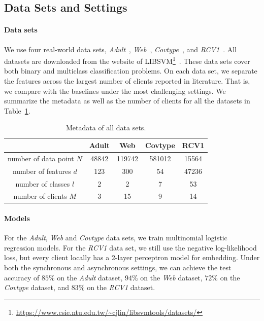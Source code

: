 \subsection{Data Sets and Settings} \label{sec:8.8.1}

\paragraph{Data sets} We use four real-world data sets, \emph{Adult}~\cite{zeng2008fast}, \emph{Web}~\cite{platt1998fast}, \emph{Covtype}~\cite{blackard1999comparative}, and \emph{RCV1}~\cite{lewis2004rcv1}. All datasets are downloaded from the website of LIBSVM\footnote{\url{https://www.csie.ntu.edu.tw/~cjlin/libsvmtools/datasets/}}~\cite{libsvm}. These data sets cover both binary and multiclass classification problems. On each data set, we separate the features across the largest number of clients reported in literature. That is, we compare with the baselines under the most challenging settings. We summarize the metadata as well as the number of clients for all the datasets in Table~\ref{tab:metadata}.

\begin{table}[t]
    \centering
    \begin{tabular}{ccccc}
    \toprule
                                & Adult     & Web       & Covtype   & RCV1 \\ \midrule
     number of data point $N$   & 48842     & 119742    & 581012    & 15564   \\
     number of features $d$     & 123       & 300       & 54        & 47236\\
     number of classes $l$      & 2         & 2         & 7         & 53   \\
     number of clients $M$      & 3         & 15        & 9         &14   \\
    \bottomrule
    \end{tabular}
    \caption{Metadata of all data sets.}
    \label{tab:metadata}
\end{table}

\paragraph{Models} For the \emph{Adult}, \emph{Web} and \emph{Covtype} data sets, we train multinomial logistic regression models. For the \emph{RCV1} data set, we still use the negative log-likelihood loss, but every client locally has a 2-layer  perceptron model for embedding. Under both the synchronous and asynchronous settings, we can achieve the test accuracy of $85\%$ on the \emph{Adult} dataset, $94\%$ on the \emph{Web} dataset, $72\%$ on the \emph{Covtype} dataset, and $83\%$ on the \emph{RCV1} dataset. 


